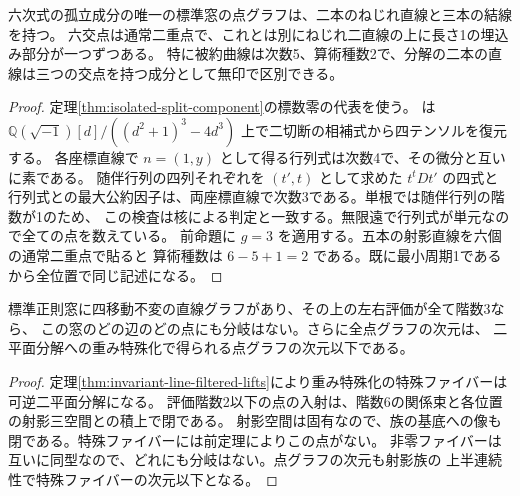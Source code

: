 \begin{corollary}\label{cor:isolated-split-point-scheme}
六次式の孤立成分の唯一の標準窓の点グラフは、二本のねじれ直線と三本の結線を持つ。
六交点は通常二重点で、これとは別にねじれ二直線の上に長さ1の埋込み部分が一つずつある。
特に被約曲線は次数5、算術種数2で、分解の二本の直線は三つの交点を持つ成分として無印で区別できる。
\end{corollary}
\begin{proof}
定理\ref{thm:isolated-split-component}の標数零の代表を使う。
 は
$\mathbb Q(\sqrt{-1})[d]/((d^2+1)^3-4d^3)$ 上で二切断の相補式から四テンソルを復元する。
各座標直線で $n=(1,y)$ として得る行列式は次数4で、その微分と互いに素である。
随伴行列の四列それぞれを $(t',t)$ として求めた $t^tDt'$ の四式と
行列式との最大公約因子は、両座標直線で次数3である。単根では随伴行列の階数が1のため、
この検査は核による判定と一致する。無限遠で行列式が単元なので全ての点を数えている。
前命題に $g=3$ を適用する。五本の射影直線を六個の通常二重点で貼ると
算術種数は $6-5+1=2$ である。既に最小周期1であるから全位置で同じ記述になる。
\end{proof}

\begin{corollary}\label{cor:no-branch-on-invariant-line-lifts}
標準正則窓に四移動不変の直線グラフがあり、その上の左右評価が全て階数3なら、
この窓のどの辺のどの点にも分岐はない。さらに全点グラフの次元は、
二平面分解への重み特殊化で得られる点グラフの次元以下である。
\end{corollary}
\begin{proof}
定理\ref{thm:invariant-line-filtered-lifts}により重み特殊化の特殊ファイバーは可逆二平面分解になる。
評価階数2以下の点の入射は、階数6の関係束と各位置の射影三空間との積上で閉である。
射影空間は固有なので、族の基底への像も閉である。特殊ファイバーには前定理によりこの点がない。
非零ファイバーは互いに同型なので、どれにも分岐はない。点グラフの次元も射影族の
上半連続性で特殊ファイバーの次元以下となる。
\end{proof}
